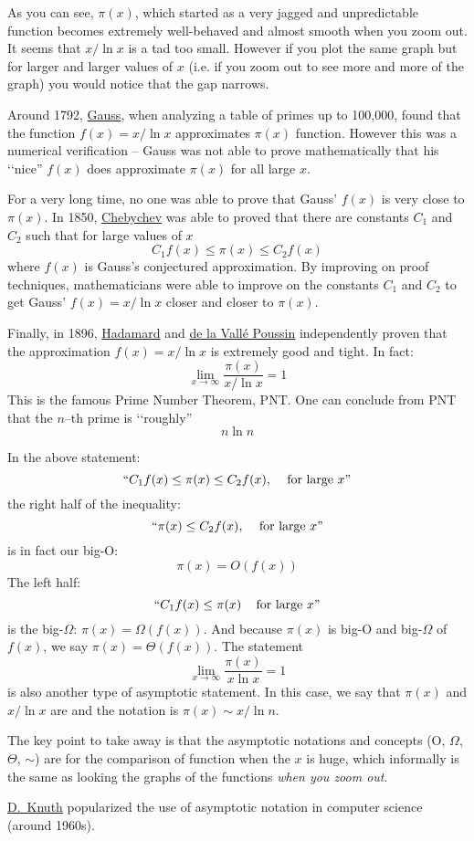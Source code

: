 As you can see, $\pi(x)$, which started as a very jagged and unpredictable function
becomes extremely well-behaved and almost smooth when you zoom out.
It seems that $x/\ln x$ is a tad too small.
However if you plot the same graph 
but for larger and larger values of $x$
(i.e. if you zoom out to see more and more of the graph)
you would notice that the gap narrows.

Around 1792, \href{https://en.wikipedia.org/wiki/Carl_Friedrich_Gauss}{Gauss},
when analyzing a table of primes up to 100,000, found that  
the function $f(x) = x/\ln x$ approximates $\pi(x)$ function.
However this was a numerical verification -- 
Gauss was not able to prove mathematically that his \lq\lq nice''
$f(x)$ does approximate $\pi(x)$ for all large $x$.

For a very long time, no one was able to prove that 
Gauss' $f(x)$ is very close to $\pi(x)$.
In 1850, \href{https://en.wikipedia.org/wiki/Pafnuty_Chebyshev}{Chebychev}
was able to proved that there are constants $C_1$ 
and $C_2$ such that for large values of $x$
\[
C_1 f(x) \leq \pi(x) \leq C_2 f(x)
\]
where $f(x)$ is Gauss's conjectured approximation.
By improving on proof techniques, mathematicians were
able to improve on the constants $C_1$ and $C_2$ to get
Gauss' $f(x) = x/\ln x$ closer and closer to $\pi(x)$.

Finally, in 1896,
\href{https://en.wikipedia.org/wiki/Jacques_Hadamard}{Hadamard}
and
\href{https://en.wikipedia.org/wiki/Charles_Jean_de_la_Vall%C3%A9e_Poussin}{de la Vall\'e Poussin}
  independently 
proven that the approximation $f(x) = x/\ln x$
is extremely good and tight. 
In fact:
\[
\lim_{x \rightarrow \infty} \frac{\pi(x)}{x/\ln x} = 1
\]
This is the famous Prime Number Theorem, PNT.
One can conclude from PNT that the $n$--th prime is \lq\lq roughly''
\[
n \ln n
\]

In the above statement: 
\[
\text{\lq\lq}C_1 f(x) \leq \pi(x) \leq C_2 f(x), \,\,\,\,\,
\text{ for large $x$''}
\]
the right half of the inequality:
\[
\text{\lq\lq}\pi(x) \leq C_2 f(x), \,\,\,\,\,
\text{ for large $x$''}
\]
is in fact our big-O:
\[
\pi(x) = O(f(x))
\]
The left half:
\[
\text{\lq\lq}C_1 f(x) \leq \pi(x) \,\,\,\,\,
\text{ for large $x$''}
\]
is the big-$\Omega$: $\pi(x) = \Omega(f(x))$.
And because $\pi(x)$ is big-O and big-$\Omega$ of $f(x)$,
we say $\pi(x) = \Theta(f(x))$.
The statement
\[
\lim_{x \rightarrow \infty} \frac{\pi(x)}{x \ln x} = 1
\]
is also another type of asymptotic statement.
In this case, we say that $\pi(x)$ and $x / \ln x$ are
and the notation is $\pi(x) \sim x/\ln n$.

The key point to take away is that the asymptotic notations and concepts
(O, $\Omega$, $\Theta$, $\sim$) are for the comparison of function
when the $x$ is huge, which informally is the same as looking
the graphs of the functions \textit{when you zoom out}.

\href{https://en.wikipedia.org/wiki/Donald_Knuth}{D.~Knuth}
popularized the use of asymptotic
notation in computer science (around 1960s).
